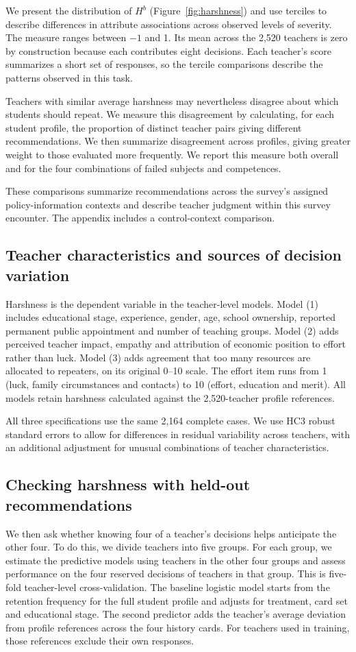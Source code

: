 We present the distribution of $H^b$ (Figure~\ref{fig:harshness}) and use terciles to describe differences in attribute associations across observed levels of severity. The measure ranges between $-1$ and 1. Its mean across the 2,520 teachers is zero by construction because each contributes eight decisions. Each teacher's score summarizes a short set of responses, so the tercile comparisons describe the patterns observed in this task.

Teachers with similar average harshness may nevertheless disagree about which students should repeat. We measure this disagreement by calculating, for each student profile, the proportion of distinct teacher pairs giving different recommendations. We then summarize disagreement across profiles, giving greater weight to those evaluated more frequently. We report this measure both overall and for the four combinations of failed subjects and competences.

These comparisons summarize recommendations across the survey's assigned policy-information contexts and describe teacher judgment within this survey encounter. The appendix includes a control-context comparison.

\subsection{Teacher characteristics and sources of decision variation}
Harshness is the dependent variable in the teacher-level models. Model (1) includes educational stage, experience, gender, age, school ownership, reported permanent public appointment and number of teaching groups. Model (2) adds perceived teacher impact, empathy and attribution of economic position to effort rather than luck. Model (3) adds agreement that too many resources are allocated to repeaters, on its original 0--10 scale. The effort item runs from 1 (luck, family circumstances and contacts) to 10 (effort, education and merit). All models retain harshness calculated against the 2,520-teacher profile references.

All three specifications use the same 2,164 complete cases. We use HC3 robust standard errors to allow for differences in residual variability across teachers, with an additional adjustment for unusual combinations of teacher characteristics.

\subsection{Checking harshness with held-out recommendations}
We then ask whether knowing four of a teacher's decisions helps anticipate the other four. To do this, we divide teachers into five groups. For each group, we estimate the predictive models using teachers in the other four groups and assess performance on the four reserved decisions of teachers in that group. This is five-fold teacher-level cross-validation. The baseline logistic model starts from the retention frequency for the full student profile and adjusts for treatment, card set and educational stage. The second predictor adds the teacher's average deviation from profile references across the four history cards. For teachers used in training, those references exclude their own responses.

